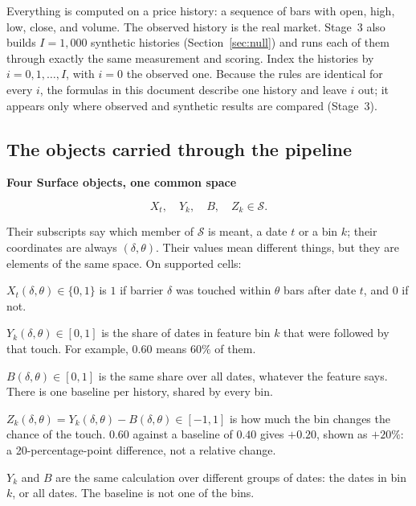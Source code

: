 \documentclass[11pt]{article}
\newenvironment{keyconcept}[1]{%
  \par\addvspace{8pt}\begin{lrbox}{\conceptbox}%
  \begin{minipage}{\dimexpr\linewidth-24pt\relax}%
  \setlength{\parindent}{0pt}%
  {\normalsize\bfseries\color{ConceptInk}#1\par}\large
}{%
  \end{minipage}\end{lrbox}%
  \noindent{\setlength{\fboxsep}{12pt}%
  \colorbox{ConceptPaper}{\usebox{\conceptbox}}}\par\addvspace{8pt}}
\begin{document}
Everything is computed on a price history: a sequence of bars with open,
high, low, close, and volume. The observed history is the real market.
Stage~3 also builds $I=1{,}000$ synthetic histories
(Section~\ref{sec:null}) and runs each of them through exactly the same
measurement and scoring. Index the histories by $i=0,1,\ldots,I$, with $i=0$
the observed one. Because the rules are identical for every $i$, the formulas
in this document describe one history and leave $i$ out; it appears only
where observed and synthetic results are compared (Stage~3).

\subsection{The objects carried through the pipeline}

\begin{keyconcept}{Four Surface objects, one common space}
\[
  X_t,\quad Y_k,\quad B,\quad Z_k\in\mathcal S.
\]
\end{keyconcept}
Their subscripts say which member of $\mathcal S$ is meant, a date $t$ or a
bin $k$; their coordinates are always $(\delta,\theta)$. Their values mean
different things, but they are elements of the same space. On supported
cells:
\begin{description}[font=\normalfont\large\bfseries\color{ConceptInk}]
 \item[Outcome Surface] $X_t(\delta,\theta)\in\{0,1\}$ is $1$ if barrier
       $\delta$ was touched within $\theta$ bars after date $t$, and $0$ if not.
 \item[Conditional probability Surface] $Y_k(\delta,\theta)\in[0,1]$ is the
       share of dates in feature bin $k$ that were followed by that touch.
       For example, $0.60$ means $60\%$ of them.
 \item[Baseline Surface] $B(\delta,\theta)\in[0,1]$ is the same share over
       all dates, whatever the feature says. There is one baseline per
       history, shared by every bin.
 \item[Shift Surface] $Z_k(\delta,\theta)=Y_k(\delta,\theta)-B(\delta,\theta)\in[-1,1]$
       is how much the bin changes the chance of the touch. $0.60$ against a
       baseline of $0.40$ gives $+0.20$, shown as $+20\%$: a 20-percentage-point
       difference, not a relative change.
\end{description}
$Y_k$ and $B$ are the same calculation over different groups of dates: the
dates in bin $k$, or all dates. The baseline is not one of the bins.
\end{document}
